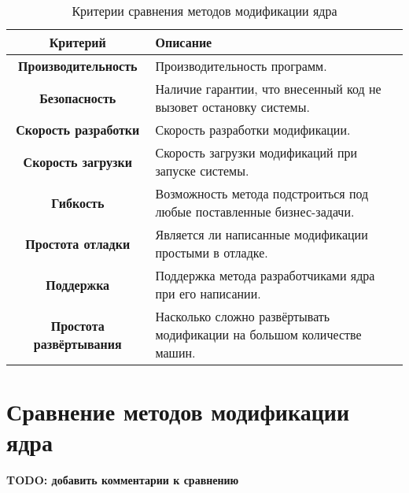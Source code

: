 \begin{table}[H]
\begin{center}
    \begin{threeparttable}
      \captionsetup{justification=raggedright,singlelinecheck=off}
      \caption{\label{tab:criteria}Критерии сравнения методов модификации ядра}
        \begin{tabular}{|c|p{8cm}|}
        \hline
        \textbf{Критерий} & \textbf{Описание} \\ \hline
        \textbf{Производительность} & Производительность программ. \\ \hline
        \textbf{Безопасность} & Наличие гарантии, что внесенный код не вызовет остановку системы. \\ \hline
        \textbf{Скорость разработки} & Скорость разработки модификации. \\ \hline
        \textbf{Скорость загрузки} & Скорость загрузки модификаций при запуске системы. \\ \hline
        \textbf{Гибкость} & Возможность метода подстроиться под любые поставленные бизнес-задачи. \\ \hline
        \textbf{Простота отладки} & Является ли написанные модификации простыми в отладке. \\ \hline
        \textbf{Поддержка} & Поддержка метода разработчиками ядра при его написании. \\ \hline
        \textbf{Простота развёртывания} & Насколько сложно развёртывать модификации на большом количестве машин. \\ \hline
        \end{tabular}
    \end{threeparttable}
\end{center}
\end{table}
\newpage
\section{Сравнение методов модификации ядра}\label{sec:---}
\textbf{TODO: добавить комментарии к сравнению}

